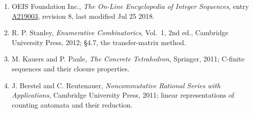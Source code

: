 \documentclass[11pt]{article}
\theoremstyle{definition}
\begin{document}
\begin{enumerate}

\item OEIS Foundation Inc., \emph{The On-Line Encyclopedia of Integer Sequences}, entry \href{https://oeis.org/A219003}{A219003}, revision 8, last modified Jul 25 2018.

\item R. P. Stanley, \emph{Enumerative Combinatorics}, Vol.~1, 2nd ed., Cambridge University Press, 2012; \S4.7, the transfer-matrix method.

\item M. Kauers and P. Paule, \emph{The Concrete Tetrahedron}, Springer, 2011; C-finite sequences and their closure properties.

\item J. Berstel and C. Reutenauer, \emph{Noncommutative Rational Series with Applications}, Cambridge University Press, 2011; linear representations of counting automata and their reduction.

\end{enumerate}
\end{document}
